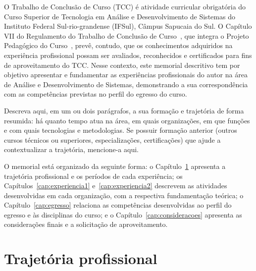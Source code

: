 \documentclass[memorial,capa]{texifsap}
\begin{document}
O Trabalho de Conclusão de Curso (TCC) é atividade curricular
obrigatória do Curso Superior de Tecnologia em Análise e Desenvolvimento
de Sistemas do Instituto Federal Sul-rio-grandense (IFSul), Câmpus
Sapucaia do Sul. O Capítulo VII do Regulamento do Trabalho de Conclusão
de Curso~\cite{IFSul:RegTCC}, que integra o Projeto Pedagógico do
Curso~\cite{IFSul:PPC}, prevê, contudo, que os conhecimentos
adquiridos na experiência profissional possam ser avaliados,
reconhecidos e certificados para fins de aproveitamento do TCC. Nesse
contexto, este memorial descritivo tem por objetivo apresentar e
fundamentar as experiências profissionais do autor na área de Análise e
Desenvolvimento de Sistemas, demonstrando a sua correspondência com as
competências previstas no perfil do egresso do curso.

Descreva aqui, em um ou dois parágrafos, a sua formação e trajetória de
forma resumida: há quanto tempo atua na área, em quais organizações, em
que funções e com quais tecnologias e metodologias. Se possuir formação
anterior (outros cursos técnicos ou superiores, especializações,
certificações) que ajude a contextualizar a trajetória, mencione-a aqui.

O memorial está organizado da seguinte forma: o Capítulo~\ref{cap:trajetoria}
apresenta a trajetória profissional e os períodos de cada experiência;
os Capítulos~\ref{cap:experiencia1} e~\ref{cap:experiencia2} descrevem as
atividades desenvolvidas em cada organização, com a respectiva
fundamentação teórica; o Capítulo~\ref{cap:egresso} relaciona as
competências desenvolvidas ao perfil do egresso e às disciplinas do
curso; e o Capítulo~\ref{cap:consideracoes} apresenta as considerações
finais e a solicitação de aproveitamento.

\chapter{Trajetória profissional}
\label{cap:trajetoria}

\end{document}
